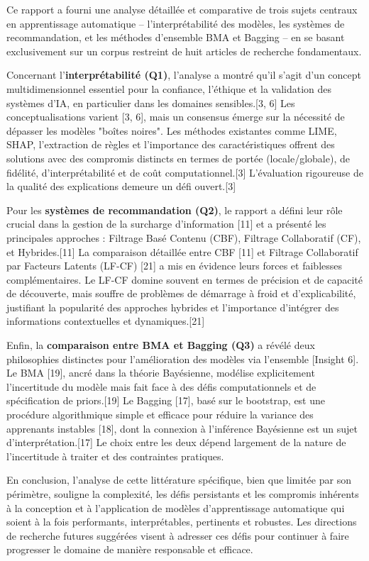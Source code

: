 \documentclass[11pt,a4paper]{article}
\begin{document}
Ce rapport a fourni une analyse détaillée et comparative de trois sujets centraux en apprentissage automatique – l'interprétabilité des modèles, les systèmes de recommandation, et les méthodes d'ensemble BMA et Bagging – en se basant exclusivement sur un corpus restreint de huit articles de recherche fondamentaux.

Concernant l'\textbf{interprétabilité (Q1)}, l'analyse a montré qu'il s'agit d'un concept multidimensionnel essentiel pour la confiance, l'éthique et la validation des systèmes d'IA, en particulier dans les domaines sensibles.[3, 6] Les conceptualisations varient [3, 6], mais un consensus émerge sur la nécessité de dépasser les modèles "boîtes noires". Les méthodes existantes comme LIME, SHAP, l'extraction de règles et l'importance des caractéristiques offrent des solutions avec des compromis distincts en termes de portée (locale/globale), de fidélité, d'interprétabilité et de coût computationnel.[3] L'évaluation rigoureuse de la qualité des explications demeure un défi ouvert.[3]

Pour les \textbf{systèmes de recommandation (Q2)}, le rapport a défini leur rôle crucial dans la gestion de la surcharge d'information [11] et a présenté les principales approches : Filtrage Basé Contenu (CBF), Filtrage Collaboratif (CF), et Hybrides.[11] La comparaison détaillée entre CBF [11] et Filtrage Collaboratif par Facteurs Latents (LF-CF) [21] a mis en évidence leurs forces et faiblesses complémentaires. Le LF-CF domine souvent en termes de précision et de capacité de découverte, mais souffre de problèmes de démarrage à froid et d'explicabilité, justifiant la popularité des approches hybrides et l'importance d'intégrer des informations contextuelles et dynamiques.[21]

Enfin, la \textbf{comparaison entre BMA et Bagging (Q3)} a révélé deux philosophies distinctes pour l'amélioration des modèles via l'ensemble [Insight 6]. Le BMA [19], ancré dans la théorie Bayésienne, modélise explicitement l'incertitude du modèle mais fait face à des défis computationnels et de spécification de priors.[19] Le Bagging [17], basé sur le bootstrap, est une procédure algorithmique simple et efficace pour réduire la variance des apprenants instables [18], dont la connexion à l'inférence Bayésienne est un sujet d'interprétation.[17] Le choix entre les deux dépend largement de la nature de l'incertitude à traiter et des contraintes pratiques.

En conclusion, l'analyse de cette littérature spécifique, bien que limitée par son périmètre, souligne la complexité, les défis persistants et les compromis inhérents à la conception et à l'application de modèles d'apprentissage automatique qui soient à la fois performants, interprétables, pertinents et robustes. Les directions de recherche futures suggérées visent à adresser ces défis pour continuer à faire progresser le domaine de manière responsable et efficace.



\nocite{*}
\clearpage
\tableofcontents
\end{document}
